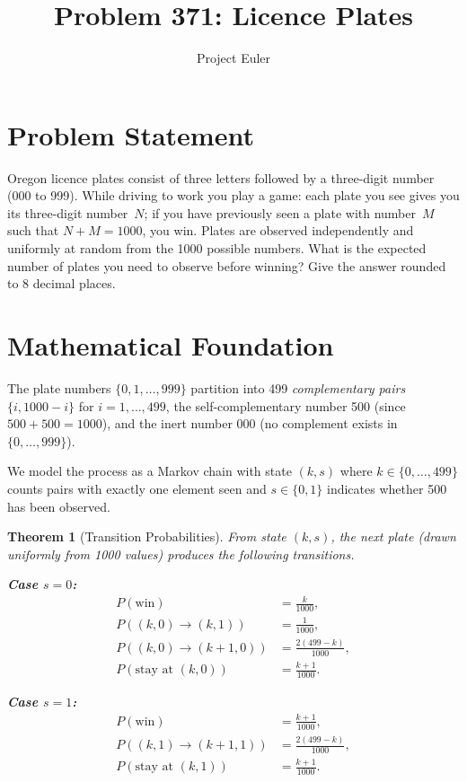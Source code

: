\documentclass[12pt]{article}
\title{Problem 371: Licence Plates}
\author{Project Euler}
\date{}
\newtheorem{theorem}{Theorem}
\begin{document}
\maketitle

\section{Problem Statement}

Oregon licence plates consist of three letters followed by a three-digit number (000 to 999). While driving to work you play a game: each plate you see gives you its three-digit number~$N$; if you have previously seen a plate with number~$M$ such that $N + M = 1000$, you win. Plates are observed independently and uniformly at random from the 1000 possible numbers. What is the expected number of plates you need to observe before winning? Give the answer rounded to 8 decimal places.

\section{Mathematical Foundation}

The plate numbers $\{0, 1, \ldots, 999\}$ partition into 499 \emph{complementary pairs} $\{i, 1000-i\}$ for $i=1,\ldots,499$, the self-complementary number 500 (since $500+500=1000$), and the inert number 000 (no complement exists in $\{0,\ldots,999\}$).

We model the process as a Markov chain with state $(k,s)$ where $k \in \{0,\ldots,499\}$ counts pairs with exactly one element seen and $s \in \{0,1\}$ indicates whether 500 has been observed.

\begin{theorem}[Transition Probabilities]
From state $(k,s)$, the next plate (drawn uniformly from 1000 values) produces the following transitions.

\textbf{Case $s=0$:}
\begin{align}
P(\text{win}) &= \frac{k}{1000}, \\
P((k,0) \to (k,1)) &= \frac{1}{1000}, \\
P((k,0) \to (k{+}1,0)) &= \frac{2(499-k)}{1000}, \\
P(\text{stay at }(k,0)) &= \frac{k+1}{1000}.
\end{align}

\textbf{Case $s=1$:}
\begin{align}
P(\text{win}) &= \frac{k+1}{1000}, \\
P((k,1) \to (k{+}1,1)) &= \frac{2(499-k)}{1000}, \\
P(\text{stay at }(k,1)) &= \frac{k+1}{1000}.
\end{align}
\end{theorem}
\end{document}
